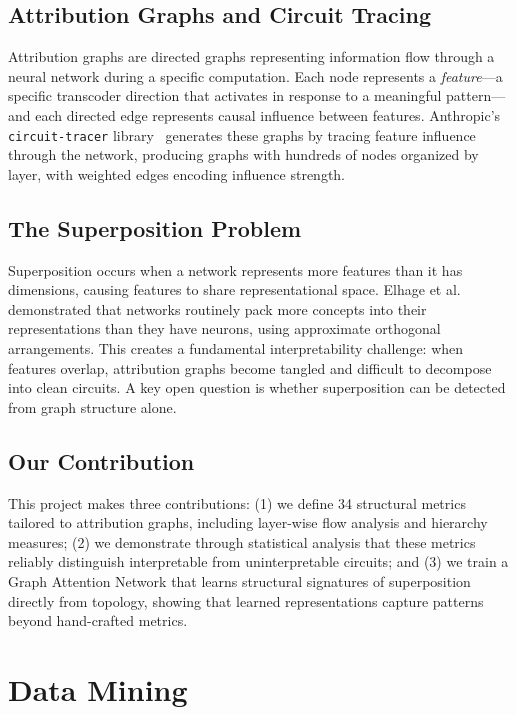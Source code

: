 \documentclass[10pt,twocolumn]{article}
\begin{document}
\subsection{Attribution Graphs and Circuit Tracing}

Attribution graphs are directed graphs representing information flow through a neural network during a specific computation. Each node represents a \textit{feature}---a specific transcoder direction that activates in response to a meaningful pattern---and each directed edge represents causal influence between features. Anthropic's \texttt{circuit-tracer} library~\cite{conerly2024circuit} generates these graphs by tracing feature influence through the network, producing graphs with hundreds of nodes organized by layer, with weighted edges encoding influence strength.

\subsection{The Superposition Problem}

Superposition occurs when a network represents more features than it has dimensions, causing features to share representational space. Elhage et al.~\cite{elhage2022superposition} demonstrated that networks routinely pack more concepts into their representations than they have neurons, using approximate orthogonal arrangements. This creates a fundamental interpretability challenge: when features overlap, attribution graphs become tangled and difficult to decompose into clean circuits. A key open question is whether superposition can be detected from graph structure alone.

\subsection{Our Contribution}

This project makes three contributions: (1) we define 34 structural metrics tailored to attribution graphs, including layer-wise flow analysis and hierarchy measures; (2) we demonstrate through statistical analysis that these metrics reliably distinguish interpretable from uninterpretable circuits; and (3) we train a Graph Attention Network that learns structural signatures of superposition directly from topology, showing that learned representations capture patterns beyond hand-crafted metrics.

\section{Data Mining}
\end{document}
